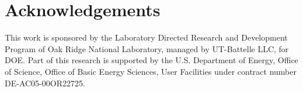 \documentclass{article}
\begin{document}
\section{Acknowledgements}\label{acknowledgements}
This work is sponsored by the Laboratory Directed Research and
Development Program of Oak Ridge National Laboratory, managed by
UT-Battelle LLC, for DOE. Part of this research is supported by the U.S.
Department of Energy, Office of Science, Office of Basic Energy
Sciences, User Facilities under contract number DE-AC05-00OR22725.



\end{document}
